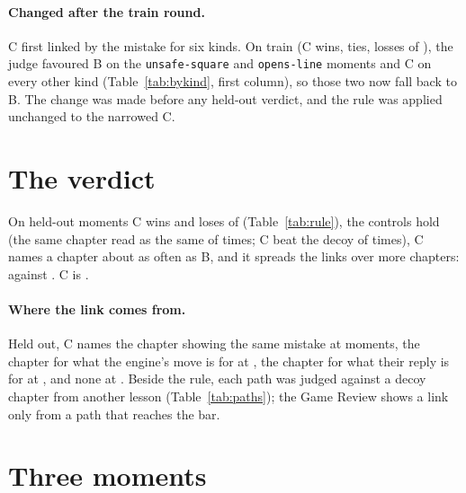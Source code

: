 \documentclass[11pt]{article}
\begin{document}
\paragraph{Changed after the train round.} C first linked by the mistake for six kinds. On train
(C \SixWins{} wins, \SixTies{} ties, \SixLosses{} losses of \SixJudged), the judge favoured B on
the \texttt{unsafe-square} and \texttt{opens-line} moments and C on every other kind
(Table~\ref{tab:bykind}, first column), so those two now fall back to B. The change was made
before any held-out verdict, and the rule was applied unchanged to the narrowed C.

\section{The verdict}

\RuleTable

\ByKindTable

On held-out moments C wins \HeldWins{} and loses \HeldLosses{} of \HeldJudged{}
(Table~\ref{tab:rule}), the controls hold (the same chapter read as the same \SameSame{} of
\SameJudged{} times; C beat the decoy \DecoyWins{} of \DecoyJudged{} times), C names a chapter
about as often as B, and it spreads the links over more chapters: \HeldCChapters{} against
\HeldBChapters. C is \Kept.

\paragraph{Where the link comes from.} Held out, C names the chapter showing the same mistake at
\HeldViaMistake{} moments, the chapter for what the engine's move is for at \HeldViaFix, the
chapter for what their reply is for at \HeldViaReply, and none at \HeldViaNone. Beside the rule,
each path was judged against a decoy chapter from another lesson (Table~\ref{tab:paths}); the
Game Review shows a link only from a path that reaches the bar.

\PathTable

\clearpage
\section{Three moments}
\end{document}
